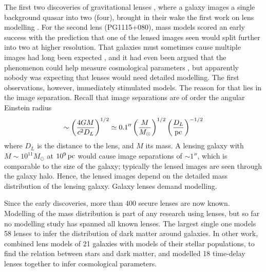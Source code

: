 \documentclass[usenatbib]{mn2e}
\begin{document}
The first two discoveries of gravitational lenses
\citep{1979Natur.279..381W,1980Natur.285..641W}, where a galaxy images
a single background quasar into two (four), brought in their wake the
first
work on lens modelling
\citep{1981ApJ...244..723Y,1981ApJ...244..736Y}.  For the second lens
(PG1115+080), mass models scored an early success with the prediction
that one of the lensed images seen would split further into two at
higher resolution.  That galaxies must sometimes cause multiple images
had long been expected \citep{1937ApJ....86..217Z}, and it had even
been argued that the phenomenon could help measure cosmological
parameters \citep{1964MNRAS.128..307R,1966MNRAS.132..101R}, but
apparently nobody was expecting that lenses would need detailed
modelling.  The first observations, however, immediately stimulated
models.  The reason for that lies in the image separation. Recall that
image separations are of order the angular Einstein radius
\begin{equation}
\sim \left(\frac{4GM}{c^2 D_L}\right)^{1/2}
\simeq 0.1'' \left(\frac{M}{M_\odot}\right)^{1/2}
             \left(\frac{D_L}{\rm pc}\right)^{-1/2}
\end{equation}
where $D_L$ is the distance to the lens, and $M$ its mass.  A lensing
galaxy with $M\sim10^{11}M_\odot$ at $10^9\rm\,pc$ would cause image
separations of $\sim1''$, which is comparable to the size of the
galaxy; typically the lensed images are seen through the galaxy halo.
Hence, the lensed images depend on the detailed mass distribution of
the lensing galaxy.  Galaxy lenses demand modelling.

Since the early discoveries, more than 400 secure lenses are now
known. Modelling of the mass distribution is part of any research
using lenses, but so far no modelling study has spanned all known
lenses.  The largest single one \citep{2009ApJ...703L..51K} models 58
lenses to infer the distribution of dark matter around galaxies.  In
other work, \cite{2011ApJ...740...97L} combined lens models of 21
galaxies with models of their stellar populations, to find the
relation between stars and dark matter, and \cite{2014MNRAS.437..600S}
modelled 18 time-delay lenses together to infer cosmological
parameters.
\end{document}
